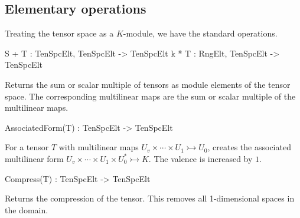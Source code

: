 \subsection{Elementary operations}
Treating the tensor space as a $K$-module, we have the standard operations.

\index{$+$}
\begin{intrinsics}
S + T : TenSpcElt, TenSpcElt -> TenSpcElt
k * T : RngElt, TenSpcElt -> TenSpcElt
\end{intrinsics}

Returns the sum or scalar multiple of tensors as module elements of the tensor 
space. The corresponding multilinear maps are the sum or scalar multiple of the 
multilinear maps.



\begin{intrinsics}
AssociatedForm(T) : TenSpcElt -> TenSpcElt
\end{intrinsics}

For a tensor $T$ with multilinear maps $U_v\times \cdots \times U_1\rightarrowtail U_0$,
creates the associated multilinear form
$U_v\times\cdots\times U_1\times U_0^*\rightarrowtail K$.  The valence is increased
by $1$.

\begin{intrinsics}
Compress(T) : TenSpcElt -> TenSpcElt
\end{intrinsics}

Returns the compression of the tensor. This removes all 1-dimensional spaces 
in the domain.


